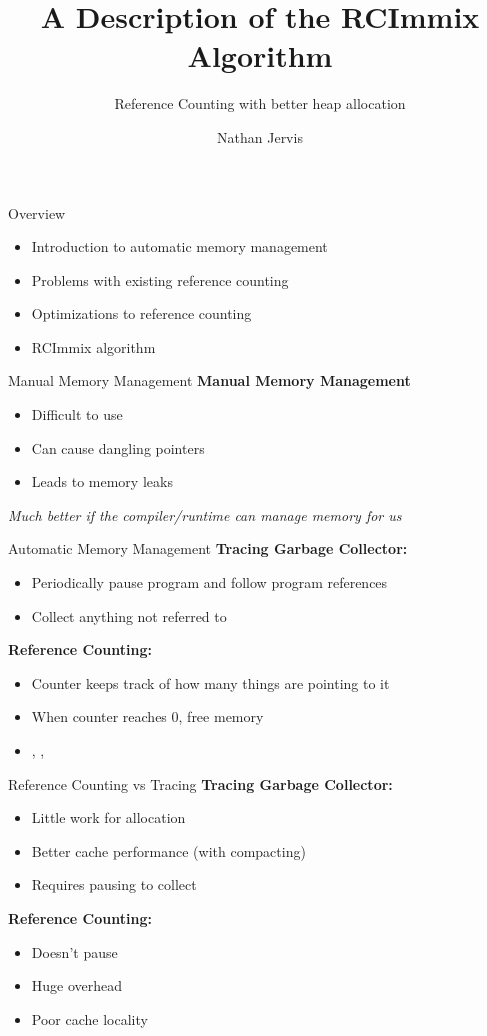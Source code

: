 \documentclass{beamer}
\title[RCImmix]{A Description of the RCImmix Algorithm}
\subtitle[RC]{Reference Counting with better heap allocation}
\author[N. Jervis]{Nathan Jervis}
\institute[McMaster]{
  Department of Computer Science\\
  McMaster University, Hamilton\\
  \texttt{jervisnd@mcmaster.ca}\\
  \texttt{1211159}
}
\begin{document}
\begin{frame}[plain]
  \titlepage
\end{frame}

\begin{frame}{Overview}
	\begin{itemize}
		\item Introduction to automatic memory management
		\item Problems with existing reference counting
		\item Optimizations to reference counting
		\item RCImmix algorithm
	\end{itemize}
\end{frame}

\begin{frame}{Manual Memory Management}
	\textbf{Manual Memory Management}
	\begin{itemize}
		\item Difficult to use
		\item Can cause dangling pointers
		\item Leads to memory leaks
	\end{itemize}
	\emph{Much better if the compiler/runtime can manage memory for us}
\end{frame}

\begin{frame}{Automatic Memory Management}
	\textbf{Tracing Garbage Collector:}
	\begin{itemize}
		\item Periodically pause program and follow program references
		\item Collect anything not referred to
	\end{itemize}
	\textbf{Reference Counting:}
	\begin{itemize}
		\item Counter keeps track of how many things are pointing to it
		\item When counter reaches 0, free memory
		\item {}, , 
	\end{itemize}
\end{frame}

\begin{frame}{Reference Counting vs Tracing}
	\textbf{Tracing Garbage Collector:}
	\begin{itemize}
		\item Little work for allocation
		\item Better cache performance (with compacting)
		\item Requires pausing to collect
	\end{itemize}
	\textbf{Reference Counting:}
	\begin{itemize}
		\item Doesn't pause
		\item Huge overhead
		\item Poor cache locality
	\end{itemize}
\end{frame}
\end{document}
